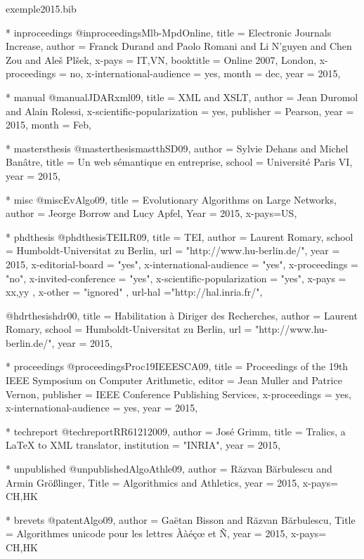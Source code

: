 \documentclass{ra2015}
\begin{document}
\begin{filecontents+}{exemple2015.bib}
{}

 
	* inproceedings
@inproceedings{Mlb-MpdOnline,
title = {Electronic Journals Increase},
author = {Franck Durand and Paolo Romani and Li N'guyen and Chen Zou and Aleš Plšek},
x-pays = {IT,VN}, 
booktitle = {Online 2007, London}, 
x-proceedings = {no}, 
x-international-audience = {yes},
month = dec,
year = 2015,
}


    * manual
@manual{JDARxml09,
title = {XML and XSLT},
author = {Jean Duromol and Alain Rolessi}, 
x-scientific-popularization = {yes}, 
publisher = {Pearson}, 
year = 2015, 
month = {Feb}, 
}


    * mastersthesis
@masterthesis{mastthSD09,
author = {Sylvie Dehans and Michel Banâtre},
title = {Un web sémantique en entreprise}, 
school = {Université Paris VI}, 
year = 2015, 
}


    * misc
@misc{EvAlgo09,
title = {Evolutionary Algorithms on Large Networks}, 
author = {Jeorge Borrow and Lucy Apfel}, 
Year = 2015, 
x-pays={US},
}


    * phdthesis
@phdthesis{TEILR09,
title = {TEI},
author = {Laurent Romary},
school = {Humboldt-Universitat zu Berlin},
url =  "http://www.hu-berlin.de/",
year = 2015, 
x-editorial-board = "yes",
x-international-audience = "yes",
x-proceedings = "no",
x-invited-conference = "yes",
x-scientific-popularization = "yes",
x-pays = {xx,yy}  ,
x-other = "ignored" ,
url-hal ="http://hal.inria.fr/",
}

@hdrthesis{hdr00,
title = {Habilitation \`a Diriger des Recherches},
author = {Laurent Romary},
school = {Humboldt-Universitat zu Berlin},
url =  "http://www.hu-berlin.de/",
year = 2015, 
}


    * proceedings
@proceedings{Proc19IEEESCA09,
title = {Proceedings of the 19th IEEE Symposium on Computer Arithmetic}, 
editor = {Jean Muller and Patrice Vernon}, 
publisher = {IEEE Conference Publishing Services}, 
x-proceedings = {yes}, 
x-international-audience = {yes}, 
year = 2015, 
}


    * techreport
@techreport{RR61212009,
author = {José Grimm},
title = {Tralics, a LaTeX to XML translator}, 
institution = "INRIA", 
year = 2015, 
}


    * unpublished
@unpublished{AlgoAthle09,
author = {R{\u{a}}zvan B{\u{a}}rbulescu and Armin Größlinger},
Title = {Algorithmics and Athletics},
year = 2015,
x-pays= {CH,HK}
}


   * brevets
@patent{Algo09,
author = {Gaëtan Bisson and Răzvan Bărbulescu},
Title = {Algorithmes unicode pour les lettres Ààéçœ et Ñ},
year = 2015,
x-pays= {CH,HK}
}


\end{filecontents+}
\end{document}
